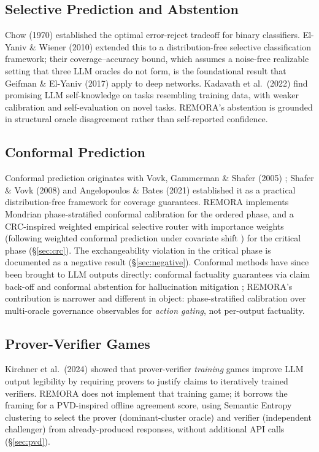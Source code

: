 \documentclass[10pt,twocolumn]{article}
\begin{document}
\subsection{Selective Prediction and Abstention}
Chow (1970) \cite{chow1970optimum} established the optimal error-reject
tradeoff for binary classifiers. El-Yaniv \& Wiener (2010)
\cite{elyaniv2010selective} extended this to a distribution-free
selective classification framework; their coverage--accuracy bound, which
assumes a noise-free realizable setting that three LLM oracles do not form,
is the foundational result that Geifman \& El-Yaniv (2017)
\cite{geifman2017selective} apply to deep networks. Kadavath
et al.\ (2022) \cite{kadavath2022language} find promising LLM
self-knowledge on tasks resembling training data, with weaker
calibration and self-evaluation on novel tasks.
REMORA's abstention is grounded in structural oracle disagreement
rather than self-reported confidence.

\subsection{Conformal Prediction}
Conformal prediction originates with Vovk, Gammerman \& Shafer (2005)
\cite{vovk2005algorithmic}; Shafer \& Vovk (2008) \cite{shafer2008tutorial}
and Angelopoulos \& Bates (2021) \cite{angelopoulos2021gentle} established
it as a practical distribution-free framework for coverage guarantees.
REMORA implements Mondrian phase-stratified conformal calibration for the
ordered phase, and a CRC-inspired weighted empirical selective router
\cite{angelopoulos2022crc} with importance weights (following weighted
conformal prediction under covariate shift \cite{tibshirani2019conformal})
for the critical phase (\S\ref{sec:crc}). The exchangeability violation in
the critical phase is documented as a negative result
(\S\ref{sec:negative}). Conformal methods have since been brought to LLM
outputs directly: conformal factuality guarantees via claim back-off
\cite{mohri2024conformal} and conformal abstention for hallucination
mitigation \cite{yadkori2024abstention}; REMORA's contribution is narrower
and different in object: phase-stratified calibration over multi-oracle
governance observables for \emph{action gating}, not per-output factuality.

\subsection{Prover-Verifier Games}
Kirchner et al.\ (2024) \cite{kirsch2024prover} showed that prover-verifier
\emph{training} games improve LLM output legibility by requiring provers
to justify claims to iteratively trained verifiers. REMORA does not
implement that training game; it borrows the framing for a PVD-inspired
offline agreement score, using Semantic Entropy clustering to select the
prover (dominant-cluster oracle) and verifier (independent challenger)
from already-produced responses, without additional API calls
(\S\ref{sec:pvd}).
\end{document}
